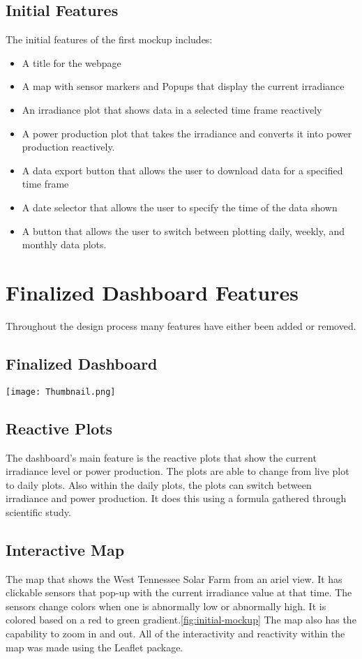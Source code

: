 \documentclass{sigchi}
\begin{document}
\subsection{Initial Features}
The initial features of the first mockup includes:
\begin{itemize}
    \item A title for the webpage
    \item A map with sensor markers and Popups that display the current irradiance
    \item An irradiance plot that shows data in a selected time frame reactively
    \item A power production plot that takes the irradiance and converts it into power production reactively.
    \item A data export button that allows the user to download data for a specified time frame
    \item A date selector that allows the user to specify the time of the data shown
    \item A button that allows the user to switch between plotting daily, weekly, and monthly data plots.
\end{itemize}

\section{Finalized Dashboard Features}
Throughout the design process many features have either been added or removed.
\subsection{Finalized Dashboard}
\texttt{[image: Thumbnail.png]}
\subsection{Reactive Plots}
The dashboard's main feature is the reactive plots that show the current irradiance level or power production. The plots are able to change from live plot to daily plots. Also within the daily plots, the plots can switch between irradiance and power production. It does this using a formula gathered through scientific study.\cite{PowerConversion}

\subsection{Interactive Map}
The map that shows the West Tennessee Solar Farm\cite{WTSF} from an ariel view. It has clickable sensors that pop-up with the current irradiance value at that time. The sensors change colors when one is abnormally low or abnormally high. It is colored based on a red to green gradient.\ref{fig:initial-mockup} The map also has the capability to zoom in and out. All of the interactivity and reactivity within the map was made using the Leaflet package.\cite{Leaflet}
\end{document}
